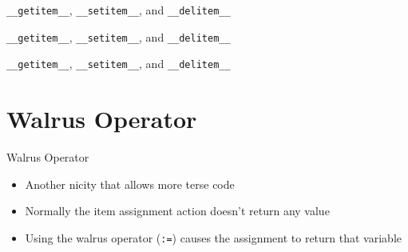 \documentclass[aspectratio=169,xcolor=dvipsnames]{beamer}
\begin{document}

\begin{frame}{\texttt{\_\_getitem\_\_}, \texttt{\_\_setitem\_\_}, and \texttt{\_\_delitem\_\_}}
  \begin{example}
    
  \end{example}
\end{frame}


\begin{frame}{\texttt{\_\_getitem\_\_}, \texttt{\_\_setitem\_\_}, and \texttt{\_\_delitem\_\_}}
  \begin{example}
    
  \end{example}
\end{frame}


\begin{frame}{\texttt{\_\_getitem\_\_}, \texttt{\_\_setitem\_\_}, and \texttt{\_\_delitem\_\_}}
  \begin{example}
    
  \end{example}
\end{frame}


\section{Walrus Operator}

\begin{frame}{Walrus Operator}
    \begin{itemize}
      \item Another nicity that allows more terse code
      \item Normally the item assignment action doesn't return any value
      \item Using the walrus operator (\texttt{:=}) causes the assignment to return that variable
    \end{itemize}
\end{frame}

\end{document}
